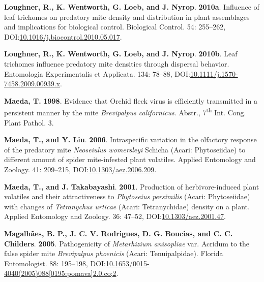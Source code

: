 \documentclass[12pt,final,CPage]{ufthesis}
\newlength{\cslhangindent}
\newenvironment{CSLReferences}[2] %
{%
	\setlength{\parindent}{0pt}
	\ifodd #1 \everypar{\setlength{\hangindent}{\cslhangindent}}\ignorespaces\fi
	\ifnum #2 > 0
	\setlength{\parskip}{#2\baselineskip}
	\fi
}%
{}
\begin{document}
{\begin{CSLReferences}{1}{0}
  \leavevmode{}%
  \textbf{Loughner, R., K. Wentworth, G. Loeb, and J. Nyrop}. \textbf{2010a}. Influence of leaf trichomes on predatory mite density and distribution in plant assemblages and implications for biological control. Biological Control. 54: 255--262, DOI:\href{https://doi.org/10.1016/j.biocontrol.2010.05.017}{10.1016/j.biocontrol.2010.05.017}.

  \leavevmode{}%
  \textbf{Loughner, R., K. Wentworth, G. Loeb, and J. Nyrop}. \textbf{2010b}. Leaf trichomes influence predatory mite densities through dispersal behavior. Entomologia Experimentalis et Applicata. 134: 78--88, DOI:\href{https://doi.org/10.1111/j.1570-7458.2009.00939.x}{10.1111/j.1570-7458.2009.00939.x}.

  \leavevmode{}%
  \textbf{Maeda, T.} \textbf{1998}. Evidence that {Orchid fleck virus} is efficiently transmitted in a persistent manner by the mite {\emph{Brevipalpus californicus}}. Abstr., 7\textsuperscript{th} Int. Cong. Plant Pathol. 3.

  \leavevmode{}%
  \textbf{Maeda, T., and Y. Liu}. \textbf{2006}. Intraspecific variation in the olfactory response of the predatory mite {\emph{Neoseiulus womersleyi}} {Schicha} {({Acari}: {Phytoseiidae})} to different amount of spider mite-infested plant volatiles. Applied Entomology and Zoology. 41: 209--215, DOI:\href{https://doi.org/10.1303/aez.2006.209}{10.1303/aez.2006.209}.

  \leavevmode{}%
  \textbf{Maeda, T., and J. Takabayashi}. \textbf{2001}. Production of herbivore-induced plant volatiles and their attractiveness to {\emph{Phytoseius persimilis}} {({Acari}: {Phytoseiidae})} with changes of {\emph{Tetranychus urticae}} {({Acari}: Tetranychidae)} density on a plant. Applied Entomology and Zoology. 36: 47--52, DOI:\href{https://doi.org/10.1303/aez.2001.47}{10.1303/aez.2001.47}.

  \leavevmode{}%
  \textbf{Magalhães, B. P., J. C. V. Rodrigues, D. G. Boucias, and C. C. Childers}. \textbf{2005}. Pathogenicity of {\emph{Metarhizium anisopliae}} var. Acridum to the false spider mite {\emph{Brevipalpus phoenicis}} ({Acari}: {Tenuipalpidae}). Florida Entomologist. 88: 195--198, DOI:\href{https://doi.org/10.1653/0015-4040(2005)088\%5B0195:pomava\%5D2.0.co;2}{10.1653/0015-4040(2005)088{[}0195:pomava{]}2.0.co;2}.


\end{CSLReferences}}
\end{document}
